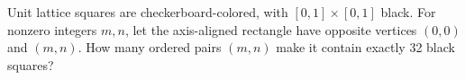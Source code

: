 Unit lattice squares are checkerboard-colored, with $[0,1]\times[0,1]$ black. For nonzero integers $m,n$, let the axis-aligned rectangle have opposite vertices $(0,0)$ and $(m,n)$. How many ordered pairs $(m,n)$ make it contain exactly 32 black squares?
